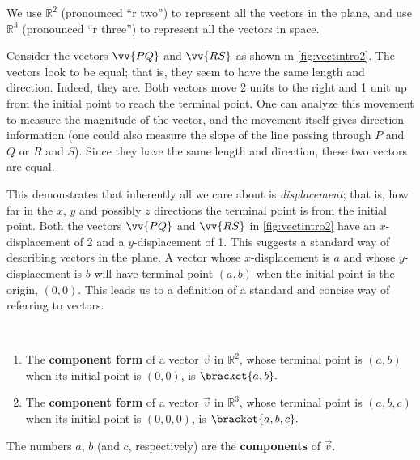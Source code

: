 
We use $\mathbb{R}^2$ (pronounced ``r two'') to represent all the vectors in the plane, and use $\mathbb{R}^3$ (pronounced ``r three'') to represent all the vectors in space.

Consider the vectors $\vv{PQ}$ and $\vv{RS}$ as shown in \autoref{fig:vectintro2}. The vectors look to be equal; that is, they seem to have the same length and direction. Indeed, they are. Both vectors move 2 units to the right and 1 unit up from the initial point to reach the terminal point. One can analyze this movement to measure the magnitude of the vector, and the movement itself gives direction information (one could also measure the slope of the line passing through $P$ and $Q$ or $R$ and $S$). Since they have the same length and direction, these two vectors are equal.

This demonstrates that inherently all we care about is \textit{displacement}; that is, how far in the $x$, $y$ and possibly $z$ directions the terminal point is from the initial point. Both the vectors $\vv{PQ}$ and $\vv{RS}$ in \autoref{fig:vectintro2} have an $x$-displacement of 2 and a $y$-displacement of 1. This suggests a standard way of describing vectors in the plane. A vector whose $x$-displacement is $a$ and whose $y$-displacement is $b$ will have terminal point $(a,b)$ when the initial point is the origin, $(0,0)$. This leads us to a definition of a standard and concise way of referring to vectors.

{\mbox{}\\[-2\baselineskip]\begin{enumerate}
	\item The \textbf{component form} of a vector $\vec{v}$ in $\mathbb{R}^2$, whose terminal point is $(a,b)$ when its initial point is $(0,0)$, is $\bracket{a,b}.$ 
	
	\item The \textbf{component form} of a vector $\vec{v}$ in $\mathbb{R}^3$, whose terminal point is $(a,b,c)$ when its initial point is $(0,0,0)$, is $\bracket{a,b,c}.$ 
	
\end{enumerate}
The numbers $a$, $b$ (and $c$, respectively) are the \textbf{components} of $\vec v$.
}

